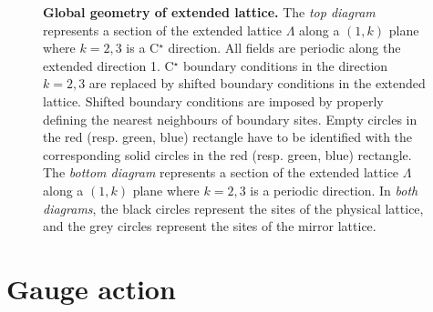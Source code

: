 \documentclass[11pt,fleqn]{article}
\begin{document}
\begin{figure}

\caption{\small\textbf{Global geometry of extended lattice.} The \textit{top diagram} represents a section of the extended lattice $\Lambda$ along a $(1,k)$ plane where $k=2,3$ is a C$^\star$ direction. All fields are periodic along the extended direction 1. C$^\star$ boundary conditions in the direction $k=2,3$ are replaced by shifted boundary conditions in the extended lattice. Shifted boundary conditions are imposed by properly defining the nearest neighbours of boundary sites. Empty circles in the red (resp. green, blue) rectangle have to be identified with the corresponding solid circles in the red (resp. green, blue) rectangle. The \textit{bottom diagram} represents a section of the extended lattice $\Lambda$ along a $(1,k)$ plane where $k=2,3$ is a periodic direction. In \textit{both diagrams}, the black circles represent the sites of the physical lattice, and the grey circles represent the sites of the mirror lattice.
\label{fig:shifted-bc}
}

\end{figure}




\section{Gauge action}
\end{document}
